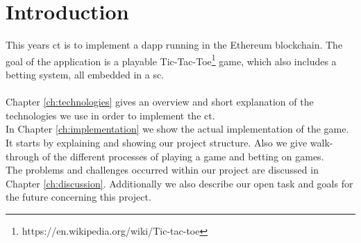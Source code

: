 \chapter{Introduction}\label{ch:introduction}
This years \ac{ct} is to implement a \ac{dapp}  running in the Ethereum blockchain. The goal of the application is a playable Tic-Tac-Toe\footnote{https://en.wikipedia.org/wiki/Tic-tac-toe} game, which also includes a betting system, all embedded in a \ac{sc}.
\\\\
Chapter \ref{ch:technologies} gives an overview and short explanation of the technologies we use in order to implement the \ac{ct}.\\
In Chapter \ref{ch:implementation} we show the actual implementation of the game. It starts by explaining and showing our project structure. Also we give walk-through of the different processes of playing a game and betting on games.\\
The problems and challenges occurred within our project are discussed in Chapter \ref{ch:discussion}. Additionally we also describe our open task and goals for the future concerning this project.